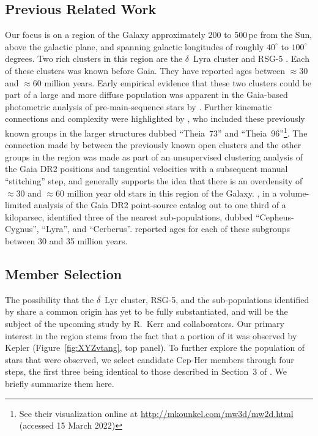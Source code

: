 \documentclass[12pt,twocolumn,linenumbers]{aastex63}
\begin{document}
\subsection{Previous Related Work}

Our focus is on a region of the Galaxy approximately 200 to 500\,pc
from the Sun, above the galactic plane, and spanning galactic
longitudes of roughly $40^\circ$ to $100^\circ$ degrees.  Two rich
clusters in this region are the $\delta$~Lyra cluster
\citep{stephenson_possible_1959} and RSG-5 \citep{roser_nine_2016}.
Each of these clusters was known before Gaia.  They have reported ages
between $\approx$30 and $\approx$60 million years.  Early empirical
evidence that these two clusters could be part of a large and more
diffuse population was apparent in the Gaia-based photometric analysis
of pre-main-sequence stars by \citet[][see their Figures~11
and~13]{Zari2018}.  Further kinematic connections and complexity were
highlighted by \citet{KounkelCovey2019}, who included these previously
known groups in the larger structures dubbed ``Theia~73'' and
``Theia~96''\footnote{See their visualization online at
\url{http://mkounkel.com/mw3d/mw2d.html} (accessed 15 March 2022)}.
The connection made by \citet{KounkelCovey2019} between the previously
known open clusters and the other groups in the region was made as
part of an unsupervised clustering analysis of the Gaia DR2 positions
and tangential velocities with a subsequent manual ``stitching'' step,
and generally supports the idea that there is an overdensity of
$\approx$30 and $\approx$60 million year old stars in this region of
the Galaxy.  \citet{Kerr2021}, in a volume-limited analysis of the
Gaia DR2 point-source catalog out to one third of a kiloparsec,
identified three of the nearest sub-populations, dubbed
``Cepheus-Cygnus'', ``Lyra'', and ``Cerberus''.  \citet{Kerr2021}
reported ages for each of these subgroups between 30 and 35 million
years.


\subsection{Member Selection}
\label{subsec:members}


The possibility that the $\delta$~Lyr cluster, RSG-5, and the
sub-populations identified by \citet{Kerr2021} share a common origin
has yet to be fully substantiated, and will be the subject of the upcoming
study by R.~Kerr and collaborators.  Our primary interest in the
region stems from the fact that a portion of it was observed by Kepler
(Figure~\ref{fig:XYZvtang}, top panel).  To further explore the
population of stars that were observed, we select candidate Cep-Her
members through four steps, the first three being identical to those
described in Section~3 of \citet{Kerr2021}.  We briefly summarize them
here.
\end{document}
